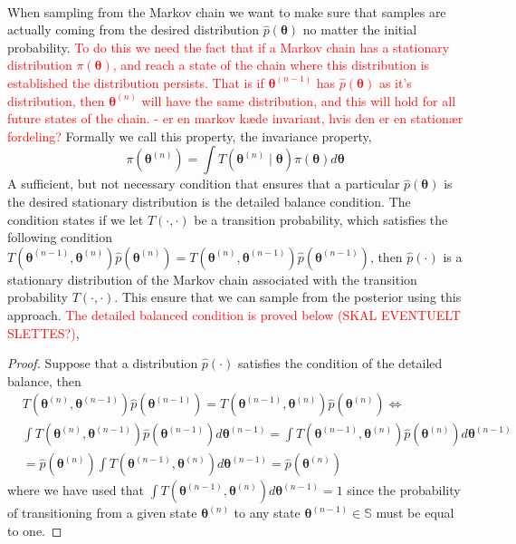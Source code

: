 \\
When sampling from the Markov chain we want to make sure that samples are actually coming from the desired distribution $\hat{p}(\boldsymbol{\theta})$ no matter the initial probability. \textcolor{red}{To do this we need the fact that if a Markov chain has a stationary distribution $\pi(\boldsymbol{\theta})$, and reach a state of the chain where this distribution is established the distribution persists. That is if $\boldsymbol{\theta}^{(n-1)}$ has $\hat{p}(\boldsymbol{\theta})$ as it's distribution, then  $\boldsymbol{\theta}^{(n)}$ will have the same distribution, and this will hold for all future states of the chain. - er en markov kæde invariant, hvis den er en stationær fordeling?} Formally we call this property, the invariance property,
\begin{equation*}
    \pi(\boldsymbol{\theta}^{(n)})=\int T(\boldsymbol{\theta}^{(n)}\mid \boldsymbol{\theta}) \pi(\boldsymbol{\theta})d\boldsymbol{\theta}
\end{equation*}
A sufficient, but not necessary condition that ensures that a particular $\hat{p}(\boldsymbol{\theta})$ is the desired stationary distribution is the detailed balance condition. The condition states if we let $T(\cdot,\cdot)$ be a transition probability, which satisfies the following condition $T(\boldsymbol{\theta}^{(n-1)}, \boldsymbol{\theta}^{(n)}) \hat{p}(\boldsymbol{\theta}^{(n)})= T(\boldsymbol{\theta}^{(n)}, \boldsymbol{\theta}^{(n-1)})\hat{p}(\boldsymbol{\theta}^{(n-1)})$, then $\hat{p}(\cdot)$ is a stationary distribution of the Markov chain associated with the transition probability $T(\cdot,\cdot)$. This ensure that we can sample from the posterior using this approach. \textcolor{red}{The detailed balanced condition is proved below (SKAL EVENTUELT SLETTES?)}, 
\begin{proof}
Suppose that a distribution $\hat{p}(\cdot)$ satisfies the condition of the detailed balance, then
 \begin{equation*}
     \begin{split}
         &T(\boldsymbol{\theta}^{(n)},\boldsymbol{\theta}^{(n-1)})\hat{p}(\boldsymbol{\theta}^{(n-1)})= T(\boldsymbol{\theta}^{(n-1)},\boldsymbol{\theta}^{(n)})\hat{p}(\boldsymbol{\theta}^{(n)}) \Leftrightarrow \\
          &\int T(\boldsymbol{\theta}^{(n)},\boldsymbol{\theta}^{(n-1)})\hat{p}(\boldsymbol{\theta}^{(n-1)})d\boldsymbol{\theta}^{(n-1)}=\int T(\boldsymbol{\theta}^{(n-1)},\boldsymbol{\theta}^{(n)})\hat{p}(\boldsymbol{\theta}^{(n)}) d\boldsymbol{\theta}^{(n-1)} \\
         &= \hat{p}(\boldsymbol{\theta}^{(n)})\int T(\boldsymbol{\theta}^{(n-1)},\boldsymbol{\theta}^{(n)})d\boldsymbol{\theta}^{(n-1)}  =\hat{p}(\boldsymbol{\theta}^{(n)})
     \end{split}
\end{equation*}
where we have used that $\int T(\boldsymbol{\theta}^{(n-1)},\boldsymbol{\theta}^{(n)})d\boldsymbol{\theta}^{(n-1)}=1$ since the probability of transitioning from a given state $\boldsymbol{\theta}^{(n)}$ to any state $\boldsymbol{\theta}^{(n-1)}\in\mathbb{S}$ must be equal to one. 
\end{proof}

